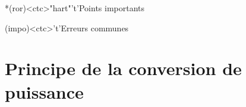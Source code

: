 \documentclass[../../main/main.tex]{subfiles}
\begin{document}
\begin{tcn}[sidebyside, fontupper=\small, fontlower=\small]
	\begin{tcn}*(ror)<ctc>"hart"'t'{Points importants}
	\end{tcn}
	\begin{tcn}(impo)<ctc>'t'{Erreurs communes}
	\end{tcn}
\end{tcn}

\vspace*{\fill}
\newpage

\section{Principe de la conversion de puissance}
\label{sec:convelecmeca}
\end{document}
